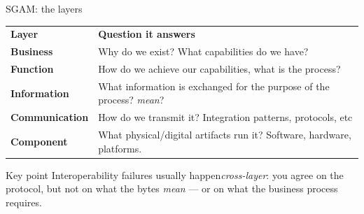 \begin{frame}{SGAM: the layers}

  \begin{table}
    \begin{tabular}{lp{11cm}}
      \rowcolor[HTML]{031d44}
      {\color{white}\textbf{Layer}} & {\color{white}\textbf{Question it answers}} \\
      \textbf{Business} & Why do we exist? What capabilities do we have? \\
      \textbf{Function} & How do we achieve our capabilities, what is the process? \\
      \textbf{Information} & What information is exchanged for the purpose of the process? \emph{mean}? \\
      \textbf{Communication} & How do we transmit it? Integration patterns, protocols, etc \\
      \textbf{Component} & What physical/digital artifacts run it? Software, hardware, platforms. \\
    \end{tabular}
  \end{table}

  \vspace{0.3cm}
  \begin{alertblock}{Key point}
    Interoperability failures usually happen\emph{cross-layer}: you agree on the protocol, but not on what the bytes \emph{mean} — or on what the business process requires.
  \end{alertblock}
\end{frame}
